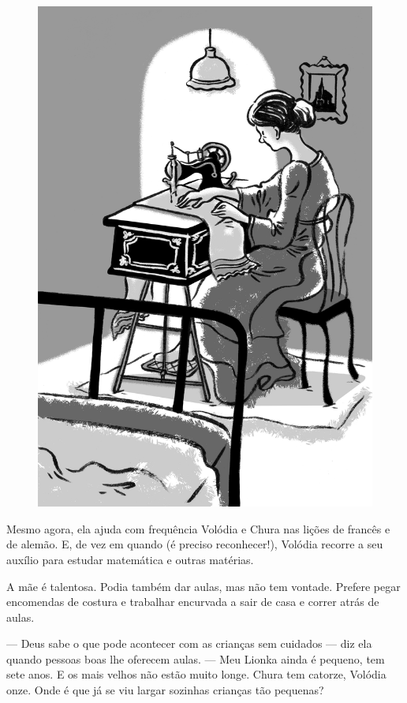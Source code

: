 \begin{figure}%
\vspace*{-1.6cm}
\hspace*{-2cm}\includegraphics[width=140mm]{./imgs/cena13.jpg}
\end{figure}

Mesmo agora, ela ajuda com frequência Volódia e Chura nas lições de
francês e de alemão. E, de vez em quando (é preciso reconhecer!),
Volódia recorre a seu auxílio para estudar matemática e outras matérias.

A mãe é talentosa. Podia também dar aulas, mas não tem vontade. Prefere
pegar encomendas de costura e trabalhar encurvada a sair de casa e
correr atrás de aulas.

--- Deus sabe o que pode acontecer com as crianças sem cuidados --- diz
ela quando pessoas boas lhe oferecem aulas. --- Meu Lionka ainda é
pequeno, tem sete anos. E os mais velhos não estão muito longe. Chura
tem catorze, Volódia onze. Onde é que já se viu largar sozinhas crianças
tão pequenas?

